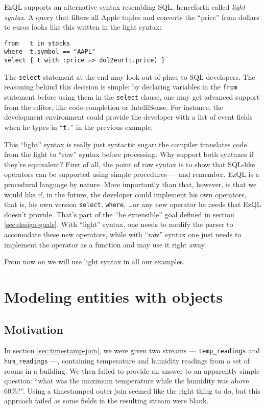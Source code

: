 \documentclass{report}
\begin{document}
EzQL supports an alternative syntax resembling SQL, henceforth called
\emph{light syntax}. A query that filters all Apple tuples and
converts the ``price'' from dollars to euros looks like this written
in the light syntax:

\begin{verbatim}
from   t in stocks
where  t.symbol == "AAPL"
select { t with :price => dol2eur(t.price) }
\end{verbatim}

The \verb=select= statement at the end may look out-of-place to SQL
developers. The reasoning behind this decision is simple: by declaring
variables in the \verb=from= statement before using them in the
\verb=select= clause, one may get advanced support from the editor,
like code-completion or IntelliSense. For instance, the development
environment could provide the developer with a list of event fields
when he types in ``\verb=t.='' in the previous example.

This ``light'' syntax is really just syntactic sugar: the compiler
translates code from the light to ``raw'' syntax before
processing. Why support both syntaxes if they're equivalent? First of
all, the point of raw syntax is to show that SQL-like operators can be
supported using simple procedures --- and remember, EzQL is a
procedural language by nature. More importantly than that, however, is
that we would like if, in the future, the developer could implement
his own operators, that is, his own version \verb=select=,
\verb=where=, \ldots or any new operator he needs that EzQL doesn't
provide. That's part of the ``be extensible'' goal defined in section
\ref{sec:design-goals}. With ``light'' syntax, one needs to modify the
parser to accomodate these new operators, while with ``raw'' syntax
one just needs to implement the operator as a function and may use it
right away.

From now on we will use light syntax in all our examples.

\chapter{Modeling entities with objects}
\label{chap:objects}

\section{Motivation}

In section \ref{sec:timestamp-join}, we were given two streams ---
\verb=temp_readings= and \verb=hum_readings= ---, containing temperature
and humidity readings from a set of rooms in a building. We then
failed to provide an answer to an apparently simple question: ``what
was the maximum temperature while the humidity was above
60\%?''. Using a timestamped outer join seemed like the right thing to
do, but this approach failed as some fields in the resulting stream
were blank.
\end{document}
